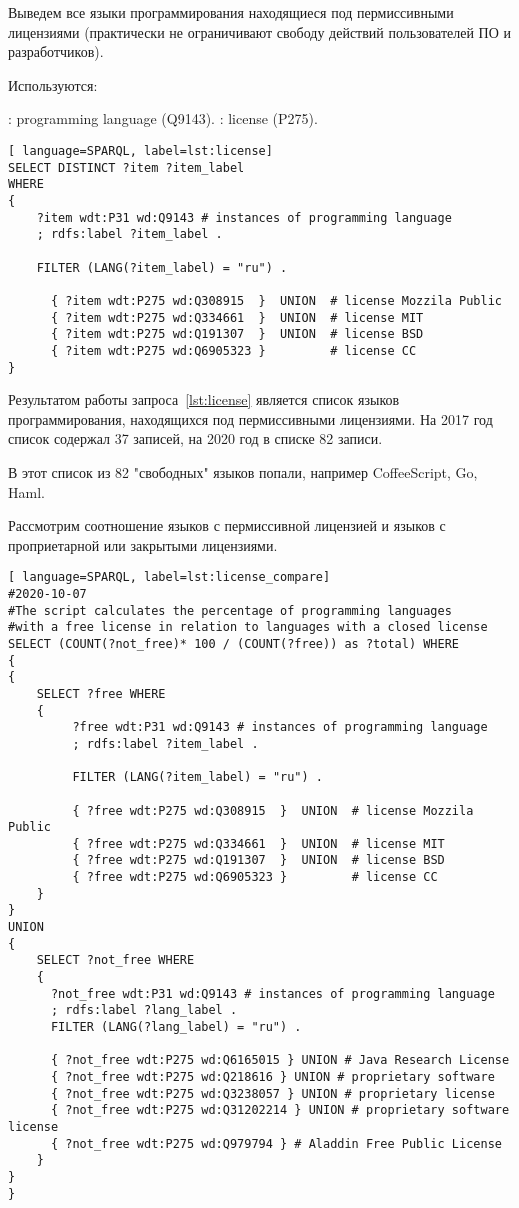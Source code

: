 Выведем все языки программирования находящиеся под пермиссивными лицензиями (практически не ограничивают свободу действий пользователей ПО и разработчиков).

Используются:
\begin{itemize}
: programming language (Q9143).
: license (P275).
\end{itemize}

\begin{lstlisting}[ language=SPARQL, label=lst:license]
SELECT DISTINCT ?item ?item_label
WHERE
{
    ?item wdt:P31 wd:Q9143 # instances of programming language
    ; rdfs:label ?item_label . 

    FILTER (LANG(?item_label) = "ru") . 
  
      { ?item wdt:P275 wd:Q308915  }  UNION  # license Mozzila Public
      { ?item wdt:P275 wd:Q334661  }  UNION  # license MIT
      { ?item wdt:P275 wd:Q191307  }  UNION  # license BSD
      { ?item wdt:P275 wd:Q6905323 }         # license CC
}
\end{lstlisting}
Результатом работы запроса~\ref{lst:license} является список языков программирования, находящихся под пермиссивными лицензиями. На 2017 год список содержал 37 записей, на 2020 год в списке 82 записи. 

В этот список из 82 "свободных" языков попали, например CoffeeScript, Go, Haml.

Рассмотрим соотношение языков с пермиссивной лицензией и языков с проприетарной или закрытыми лицензиями.
\begin{lstlisting}[ language=SPARQL, label=lst:license_compare]
#2020-10-07
#The script calculates the percentage of programming languages 
#with a free license in relation to languages with a closed license
SELECT (COUNT(?not_free)* 100 / (COUNT(?free)) as ?total) WHERE
{ 
{
    SELECT ?free WHERE 
    {
         ?free wdt:P31 wd:Q9143 # instances of programming language
         ; rdfs:label ?item_label . 

         FILTER (LANG(?item_label) = "ru") . 
  
         { ?free wdt:P275 wd:Q308915  }  UNION  # license Mozzila Public
         { ?free wdt:P275 wd:Q334661  }  UNION  # license MIT
         { ?free wdt:P275 wd:Q191307  }  UNION  # license BSD
         { ?free wdt:P275 wd:Q6905323 }         # license CC
    }
}
UNION
{
    SELECT ?not_free WHERE 
    {
      ?not_free wdt:P31 wd:Q9143 # instances of programming language
      ; rdfs:label ?lang_label . 
      FILTER (LANG(?lang_label) = "ru") .
  
      { ?not_free wdt:P275 wd:Q6165015 } UNION # Java Research License
      { ?not_free wdt:P275 wd:Q218616 } UNION # proprietary software
      { ?not_free wdt:P275 wd:Q3238057 } UNION # proprietary license 
      { ?not_free wdt:P275 wd:Q31202214 } UNION # proprietary software license 
      { ?not_free wdt:P275 wd:Q979794 } # Aladdin Free Public License
    }
}
}
\end{lstlisting}

